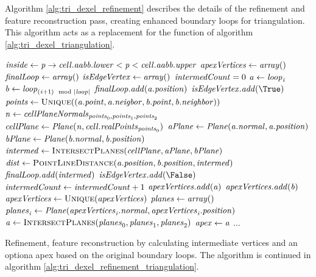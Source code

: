 Algorithm \ref{alg:tri_dexel_refinement} describes the details of the refinement and feature reconstruction pass, creating enhanced boundary loops for triangulation.
This algorithm acts as a replacement for the  function of algorithm \ref{alg:tri_dexel_triangulation}.
%
\begin{algorithm}
	\centering
	\begin{algorithmic}[1]
			\State $\mathit{inside} \gets \mathit{p} \rightarrow \mathit{cell}.\mathit{aabb}.\mathit{lower} < \mathit{p} < \mathit{cell}.\mathit{aabb}.\mathit{upper}$
			\State $\mathit{apexVertices} \gets \mathit{array}()$
			\State $\mathit{finalLoop} \gets \mathit{array}()$
			\State $\mathit{isEdgeVertex} \gets \mathit{array}()$
			\State $\mathit{intermedCount} = 0$
				\State $\mathit{a} \gets \mathit{loop}_{\mathit{i}}$
				\State $\mathit{b} \gets \mathit{loop}_{(\mathit{i} + 1) \mod |\mathit{loop}|}$
				\State $\mathit{finalLoop}.\mathit{add}(\mathit{a}.\mathit{position})$
				\State $\var{isEdgeVertex}.\var{add}(\True)$
				\State $\var{points} \gets \Call{Unique}{(\var{a}.\var{point}, \var{a}.\var{neigbor}, \var{b}.\var{point}, \var{b}.\var{neighbor})}$
				\State $\mathit{n} \gets \mathit{cellPlaneNormals}_{\mathit{points}_0, \mathit{points}_1, \mathit{points}_2}$
				\State $\mathit{cellPlane} \gets \mathit{Plane}(\mathit{n}, \mathit{cell}.\mathit{realPoints}_{\mathit{points}_0})$
				\State $\mathit{aPlane} \gets \mathit{Plane}(\mathit{a}.\mathit{normal}, \mathit{a}.\mathit{position})$
				\State $\mathit{bPlane} \gets \mathit{Plane}(\mathit{b}.\mathit{normal}, \mathit{b}.\mathit{position})$
				\State $\var{intermed} \gets \Call{IntersectPlanes}{\var{cellPlane}, \var{aPlane}, \var{bPlane}}$
					\State $\var{dist} \gets \Call{PointLineDistance}{\var{a}.\var{position}, \var{b}.\var{position}, \var{intermed}}$
						\State $\mathit{finalLoop}.\mathit{add}(\mathit{intermed})$
						\State $\var{isEdgeVertex}.\var{add}(\False)$
						\State $\mathit{intermedCount} \gets \mathit{intermedCount} + 1$
						\State $\mathit{apexVertices}.\mathit{add}(\mathit{a})$
						\State $\mathit{apexVertices}.\mathit{add}(\mathit{b})$
					\EndIf
				\EndIf
			\EndFor
				\State $\var{apexVertices} \gets \Call{Unique}{\var{apexVertices}}$
				\State $\mathit{planes} \gets \mathit{array}()$
					\State $\mathit{planes}_{\mathit{i}} \gets \mathit{Plane}(\mathit{apexVertices}_{\mathit{i}}.\mathit{normal}, \mathit{apexVertices}_{\mathit{i}}.\mathit{position})$
				\EndFor
				\State $\var{a} \gets \Call{IntersectPlanes}{\var{planes}_0, \var{planes}_1, \var{planes}_2}$
					\State $\mathit{apex} \gets \mathit{a}$
				\EndIf
			\EndIf
			\State $\dots$
	\end{algorithmic}
	\caption{
		Refinement, feature reconstruction by calculating intermediate vertices and an optiona apex based on the original boundary loops.
		The algorithm is continued in algorithm \ref{alg:tri_dexel_refinement_triangulation}.
	}
	\label{alg:tri_dexel_refinement}
\end{algorithm}
